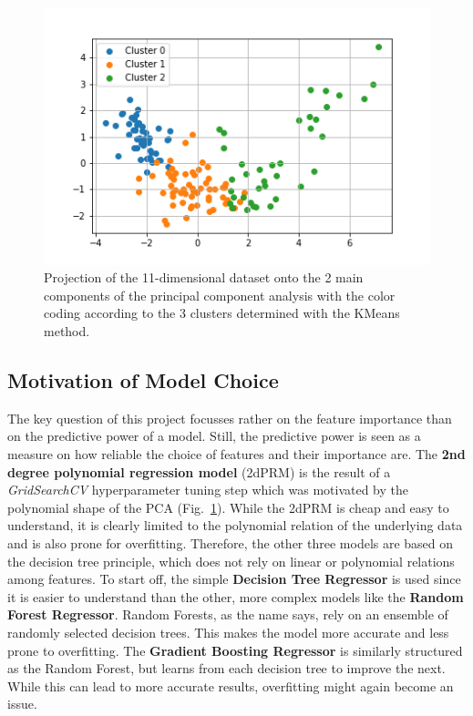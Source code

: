 \documentclass[a4paper, 11pt]{article} %
\begin{document}
\begin{figure}[htbp]
   \includegraphics[width=0.9\linewidth]{figures/PCA_Clusters.png} 
   \caption{Projection of the 11-dimensional dataset onto the 2 main components of the principal component analysis with the color coding according to the 3 clusters determined with the KMeans method.}
   \label{fig:PCA}
\end{figure}

\subsection{Motivation of Model Choice}
The key question of this project focusses rather on the feature importance than on the predictive power of a model. Still, the predictive power is seen as a measure on how reliable the choice of features and their importance are. The \textbf{2nd degree polynomial regression model} (2dPRM) is the result of a \textit{GridSearchCV} hyperparameter tuning step which was motivated by the polynomial shape of the PCA (Fig.~\ref{fig:PCA}). While the 2dPRM is cheap and easy to understand, it is clearly limited to the polynomial relation of the underlying data and is also prone for overfitting. Therefore, the other three models are based on the decision tree principle, which does not rely on linear or polynomial relations among features. To start off, the simple \textbf{Decision Tree Regressor} is used since it is easier to understand than the other, more complex models like the \textbf{Random Forest Regressor}. Random Forests, as the name says, rely on an ensemble of randomly selected decision trees. This makes the model more accurate and less prone to overfitting. The \textbf{Gradient Boosting Regressor} is similarly structured as the Random Forest, but learns from each decision tree to improve the next. While this can lead to more accurate results, overfitting might again become an issue. 
\end{document}
